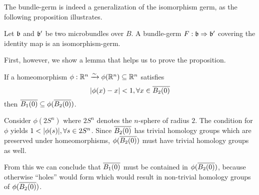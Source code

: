 \begin{myparagraph}
    The bundle-germ is indeed a generalization of the isomorphism germ, as the following proposition illustrates.
\end{myparagraph}

\begin{myproposition}[Williamson]
    Let $\mathfrak{b}$ and $\mathfrak{b}'$ be two microbundles over $B$.
    A bundle-germ $F: \mathfrak{b} \Rightarrow \mathfrak{b}'$ covering the identity map is an isomorphism-germ.
\end{myproposition}

\begin{myparagraph}
    First, however, we show a lemma that helps us to prove the proposition.
\end{myparagraph}

\begin{mylemma}
    If a homeomorphism $\phi: \mathbb{R}^n \xrightarrow{\sim} \phi(\mathbb{R}^n) \subseteq{} \mathbb{R}^n$ satisfies
    \[ \abs{\phi(x) - x} < 1, \forall x \in \clball[2] \]
    then $\clball[1] \sub \phi(\clball[2])$.
\end{mylemma}

\begin{myproof}
    Consider $\phi(2S^n)$ where $2S^n$ denotes the $n$-sphere of radius $2$.
    The condition for $\phi$ yields $1 < \vert{} \phi(s) \vert{}, \forall s \in 2S^n$.
    Since $\clball[2]$ has trivial homology groups which are preserved under homeomorphisms,
    $\phi(\clball[2])$ must have trivial homology groups as well.

    From this we can conclude that $\clball[1]$ must be contained in $\phi(\clball[2])$,
    because otherwise ``holes'' would form which would result in non-trivial homology groups of $\phi(\clball[2])$.
\end{myproof}

